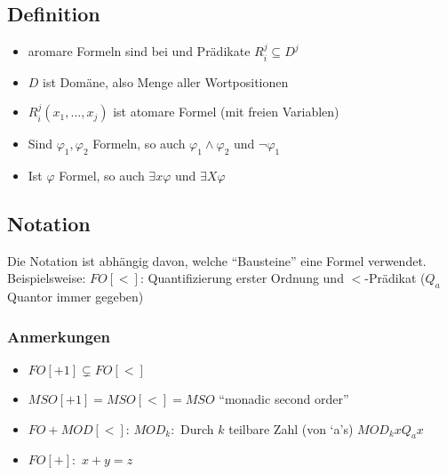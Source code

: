     \subsection{Definition}
        \begin{itemize}
            \item aromare Formeln sind bei und Prädikate $R_i^j\subseteq D^j$
            \item $D$ ist Domäne, also Menge aller Wortpositionen
            \item $R_i^j(x_1,\dots,x_j)$ ist atomare Formel (mit freien Variablen)
            \item Sind $\varphi_1,\varphi_2$ Formeln, so auch $\varphi_1\wedge\varphi_2$ und $\neg \varphi_1$
            \item Ist $\varphi$ Formel, so auch $\exists x\varphi$ und $\exists X\varphi$
        \end{itemize}
    \subsection{Notation}
        Die Notation ist abhängig davon, welche ``Bausteine'' eine Formel verwendet. Beispielsweise:
        $FO[<]$: Quantifizierung erster Ordnung und $<$-Prädikat ($Q_a$ Quantor immer gegeben)\\
        \subsubsection{Anmerkungen}
            \begin{itemize}
                \item $FO[+1]\subsetneq FO[<]$
                \item $MSO[+1]=MSO[<]=MSO$ ``monadic second order''
                \item $FO+MOD[<]$: $MOD_k:$ Durch $k$ teilbare Zahl (von `a's) $MOD_kxQ_ax$
                \item $FO[+]:$ $x+y=z$
            \end{itemize}
